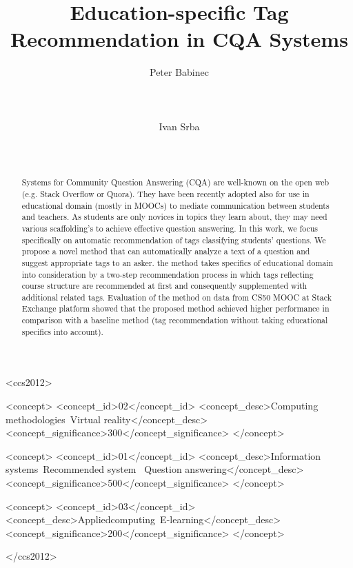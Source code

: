 \documentclass{sig-alternate}
\begin{document}
\setlength{\heavyrulewidth}{1.2pt}
\setlength{\lightrulewidth}{0.7pt}

\title{Education-specific Tag Recommendation in CQA Systems}


\author{
\alignauthor
Peter Babinec\\
       \\
       \\
       \\
\alignauthor
Ivan Srba\\
       \\
       \\
}

\maketitle

\begin{abstract}
Systems for Community Question Answering (CQA) are well-known
on the open web (e.g. Stack Overflow or Quora). They have been
recently adopted also for use in educational domain (mostly in
MOOCs) to mediate communication between students and teachers.
As students are only novices in topics they learn about, they may
need various scaffolding's to achieve effective question answering.
In this work, we focus specifically on automatic recommendation
of tags classifying students’ questions. We propose a novel method
that can automatically analyze a text of a question and suggest appropriate tags to an asker. the method takes specifics of educational
domain into consideration by a two-step recommendation process
in which tags reflecting course structure are recommended at first
and consequently supplemented with additional related tags. Evaluation of the method on data from CS50 MOOC at Stack Exchange
platform showed that the proposed method achieved higher performance in comparison with a baseline method (tag recommendation
without taking educational specifics into account).
\end{abstract}

\begin{CCSXML}
    <ccs2012>
    
    <concept>
    <concept_id>02</concept_id>
    <concept_desc>Computing methodologies~Virtual reality</concept_desc>
    <concept_significance>300</concept_significance>
    </concept>
    
    <concept>
    <concept_id>01</concept_id>
    <concept_desc>Information systems~Recommended system~ Question answering</concept_desc>
    <concept_significance>500</concept_significance>
    </concept>
    
    <concept>
    <concept_id>03</concept_id>
    <concept_desc>Appliedcomputing~E-learning</concept_desc>
    <concept_significance>200</concept_significance>
    </concept>
    
    </ccs2012>
\end{CCSXML}
\end{document}

